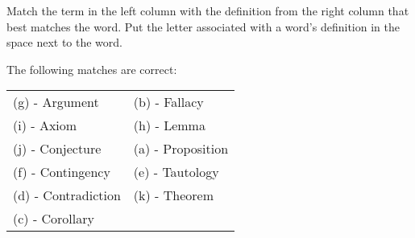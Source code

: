 \documentclass[12pt,addpoints]{exam}
\begin{document}
\begin{questions}
\question[22]  Match the term in the left column with the definition
from the right column that best matches the word.  Put the letter
associated with a word's definition in the space next to the word.

\normalsize

    \begin{solution}
    The following matches are correct:

    \begin{tabular}{ll}
        (g) - Argument      & (b) - Fallacy \\
        (i) - Axiom         & (h) - Lemma  \\
        (j) - Conjecture    & (a) - Proposition \\
        (f) - Contingency   & (e) - Tautology \\
        (d) - Contradiction & (k) - Theorem \\
        (c) - Corollary     & \\
    \end{tabular}
    \end{solution}



\end{questions}
\end{document}
